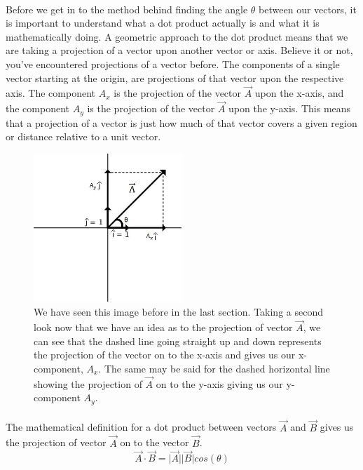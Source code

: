 \documentclass[12pt, letterpaper]{report}
\begin{document}
		\paragraph{} Before we get in to the method behind finding the angle $\theta$ between our vectors, it is important to understand what a dot product actually is and what it is mathematically doing. A geometric approach to the dot product means that we are taking a projection of a vector upon another vector or axis. Believe it or not, you've encountered projections of a vector before. The components of a single vector starting at the origin, are projections of that vector upon the respective axis. The component $A_x$ is the projection of the vector $\vec{A}$ upon the x-axis, and the component $A_y$ is the projection of the vector $\vec{A}$ upon the y-axis. This means that a projection of a vector is just how much of that vector covers a given region or distance relative to a unit vector. 
		\begin{figure}[ht]
		\centering
		\includegraphics[width=0.5\textwidth]{Processing Images/UnitVector/UnitVector.jpg}
		\caption{We have seen this image before in the last section. Taking a second look now that we have an idea as to the projection of vector $\vec{A}$, we can see that the dashed line going straight up and down represents the projection of the vector on to the x-axis and gives us our x-component, $A_x$. The same may be said for the dashed horizontal line showing the projection of $\vec{A}$ on to the y-axis giving us our y-component $A_y$.}
		\end{figure}
\newpage
		\paragraph{} The mathematical definition for a dot product between vectors $\vec{A}$ and $\vec{B}$ gives us the projection of vector $\vec{A}$ on to the vector $\vec{B}$. 
		\begin{equation*}
		\vec{A}\cdot\vec{B} = \lvert\vec{A}\rvert\lvert\vec{B}\rvert cos\left(\theta\right)
		\end{equation*}
\end{document}

